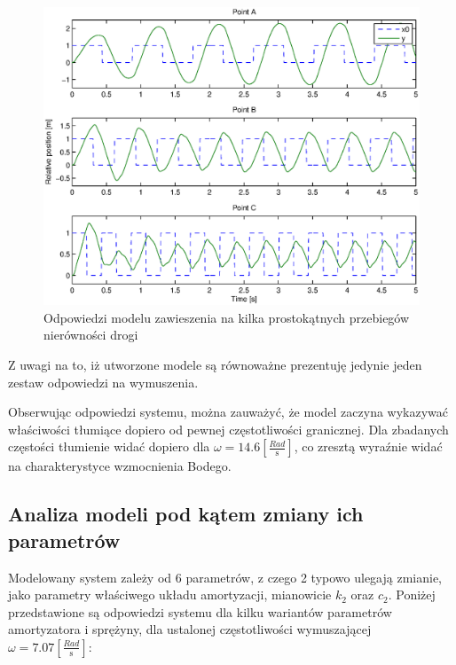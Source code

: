 \documentclass[12pt]{article}
\begin{document}
\begin{figure}[!htb]
	\begin{center}
		\includegraphics[width=\linewidth]{../res/img/responces.eps}
	\end{center}
	\caption{Odpowiedzi modelu zawieszenia na kilka prostokątnych przebiegów
	nierówności drogi}
\end{figure}

Z uwagi na to, iż utworzone modele są równoważne prezentuję jedynie jeden zestaw
odpowiedzi na wymuszenia.

Obserwując odpowiedzi systemu, można zauważyć, że model zaczyna wykazywać
właściwości tłumiące dopiero od pewnej częstotliwości granicznej. Dla zbadanych
częstości tłumienie widać dopiero dla $\omega=14.6
[\frac{Rad}{\textrm{s}}]$, co zresztą wyraźnie widać na charakterystyce
wzmocnienia Bodego.

\newpage

\subsection{Analiza modeli pod kątem zmiany ich parametrów}

Modelowany system zależy od 6 parametrów, z czego 2 typowo ulegają zmianie, jako
parametry właściwego układu amortyzacji, mianowicie $k_2$ oraz $c_2$. Poniżej
przedstawione są odpowiedzi systemu dla kilku wariantów parametrów amortyzatora
i sprężyny, dla ustalonej częstotliwości wymuszającej
$\omega=7.07[\frac{Rad}{\textrm{s}}]$:
\end{document}
